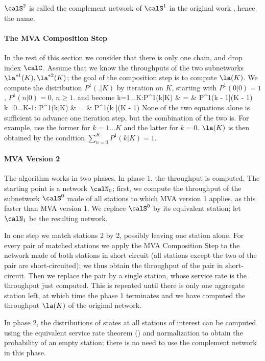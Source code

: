 $\calS^2$ is called the complement network of
$\calS^1$ in the original work
\cite{reiser1981mean}, hence the name.

\paragraph{The MVA Composition Step}
In the rest of this section we consider that
there is only one chain, and drop index $\calC$.
Assume that we know the throughputs of the two
subnetworks $\la^{*1}(K), \la^{*2}(K)$; the goal
of the composition step is to compute $\la(K)$.
We compute the distribution $P^1(.|K)$ by
iteration on $K$, starting with $P^1(0|0)=1$,
$P^1(n|0)=0$, $n\geq 1$.
 and
 become
  \bear
  \mfor k=1...K\;:\;P^1(k|K) & = & P^1(k - 1|(K - 1)
   \\
\mfor k=0...K-1\;:\;  P^1(k|K) & = & P^1(k |(K -
1)
  \eear
None of the two equations alone is sufficient to
advance one iteration step, but the combination
of the two is. For example, use the former for
$k=1...K$ and the latter for $k=0$. $\la(K)$ is
then obtained by the condition
$\sum_{n=0}^KP^1(k|K)=1$.

\paragraph{MVA Version 2}
The algorithm works in two phases. In phase 1,
the throughput is computed. The starting point is
a network $\calN_0$; first, we compute the
throughput of the subnetwork $\calS^0$ made of
all stations to which MVA version 1 applies, as
this faster than MVA version 1. We replace
$\calS^0$ by its equivalent station; let
$\calN_1$ be the resulting network.

In one step we match stations 2 by 2, possibly
leaving one station alone. For every pair of
matched stations we apply the MVA Composition
Step to the network made of both stations in
short circuit (all stations except the two of the
pair are short-circuited); we thus obtain the
throughput of the pair in short-circuit. Then we
replace the pair by a single station, whose
service rate is the throughput just computed.
This is repeated until there is only one
aggregate station left, at which time the phase 1
terminates and we have computed the throughput
$\la(K)$ of the original network.

In phase 2, the distributions of states at all
stations of interest can be computed using the
equivalent service rate theorem
() and normalization to obtain
the probability of an empty station; there is no
need to use the complement network in this phase.

